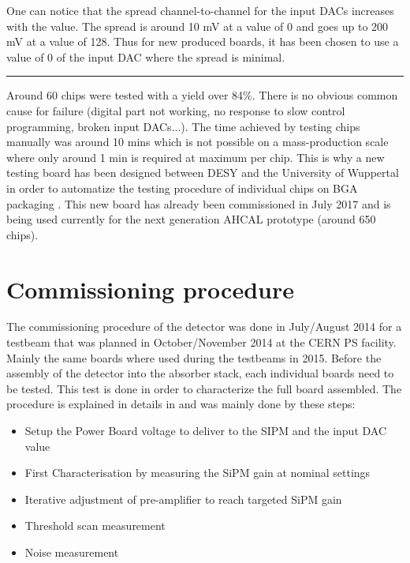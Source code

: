 One can notice that the spread channel-to-channel for the input DACs increases with the value. The spread is around 10 mV at a value of 0 and goes up to 200 mV at a value of 128. Thus for new produced boards, it has been chosen to use a value of 0 of the input DAC where the spread is minimal.

\begin{center}
  \rule{0.5\textwidth}{.4pt}
\end{center}

Around 60 chips were tested with a yield over 84\%. There is no obvious common cause for failure (digital part not working, no response to slow control programming, broken input DACs...). The time achieved by testing chips manually was around 10 mins which is not possible on a mass-production scale where only around 1 min is required at maximum per chip. This is why a new testing board has been designed between DESY and the University of Wuppertal in order to automatize the testing procedure of individual chips on BGA packaging \cite{AHCALMain2016_Amine}. This new board has already been commissioned in July 2017 and is being used currently for the next generation AHCAL prototype (around 650 chips).

\section{Commissioning procedure}

The commissioning procedure of the detector was done in July/August 2014 for a testbeam that was planned in October/November 2014 at the CERN PS facility. Mainly the same boards where used during the testbeams in 2015. Before the assembly of the detector into the absorber stack, each individual boards need to be tested. This test is done in order to characterize the full board assembled. The procedure is explained in details in \cite{} and was mainly done by these steps:

\begin{itemize}
  \item Setup the Power Board voltage to deliver to the SIPM and the input DAC value
  \item First Characterisation by measuring the SiPM gain at nominal settings
  \item Iterative adjustment of pre-amplifier to reach targeted SiPM gain
  \item Threshold scan measurement
  \item Noise measurement
\end{itemize}

